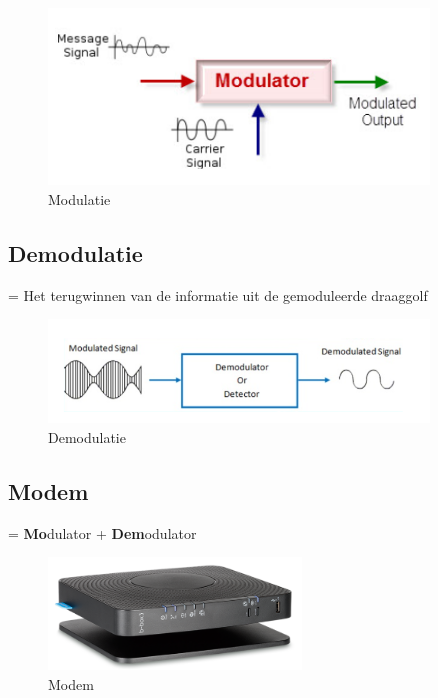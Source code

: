 \documentclass{article}
\newcommand{\bold}[1]{\textbf{#1}}
\begin{document}
\begin{figure}[H]
    \centering
    \includegraphics[width=0.9\textwidth]{Screenshot_20200302_115326.png}
    \caption{Modulatie}
\end{figure}

\subsection{Demodulatie}
= Het terugwinnen van de informatie uit de gemoduleerde draaggolf

\begin{figure}[H]
    \centering
    \includegraphics[width=0.9\textwidth]{Screenshot_20200302_115359.png}
    \caption{Demodulatie}
\end{figure}

\subsection{Modem}
= \bold{Mo}dulator + \bold{Dem}odulator

\begin{figure}[H]
    \centering
    \includegraphics[width=0.6\textwidth]{Screenshot_20200302_115504.png}
    \caption{Modem}
\end{figure}
\end{document}
